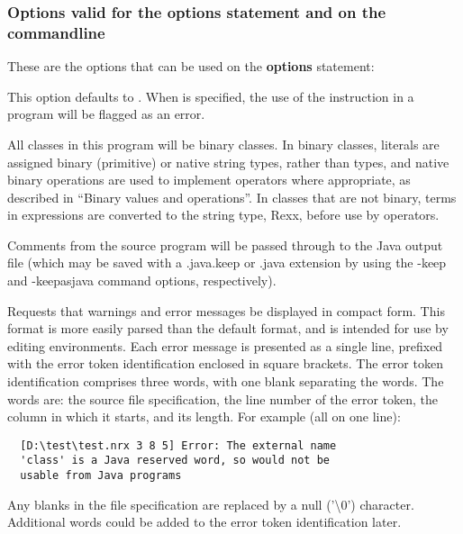 \subsubsection{Options valid for the options statement and on the commandline}
These are the options that can be used on the \textbf{options} statement:
\begin{description}
\item[address]
This option defaults to . When  is specified, the use of the  instruction in a program will be flagged as an error. 

\item[binary]
All classes in this program will be binary classes. In binary classes, literals are assigned binary (primitive) or native string types, rather than \nr{} types, and native binary operations are used to implement operators where appropriate, as described in “Binary values and operations”. In classes that are not binary, terms in expressions are converted to the \nr{} string type, Rexx, before use by operators.

\item[comments]
Comments from the \nr{} source program will be passed through to the Java output file (which may be saved with a .java.keep or .java extension by using the -keep and -keepasjava command options, respectively).

\item[compact]
Requests that warnings and error messages be displayed in compact form. This format is more easily parsed than the default format, and is intended for use by editing environments.
Each error message is presented as a single line, prefixed with the error token identification enclosed in square brackets. The error token identification comprises three words, with one blank separating the words. The words are: the source file specification, the line number of the error token, the column in which it starts, and its length. For example (all on one line):
\begin{verbatim}
  [D:\test\test.nrx 3 8 5] Error: The external name
  'class' is a Java reserved word, so would not be
  usable from Java programs
\end{verbatim}
Any blanks in the file specification are replaced by a null ('\textbackslash 0') character. Additional words could be added to the error token identification later.


\end{description}
